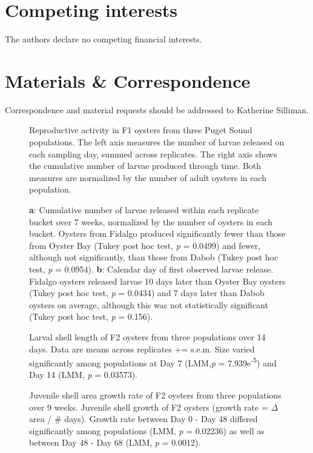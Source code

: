 \documentclass[fleqn,10pt]{wlscirep}
\begin{document}
\section*{Competing interests}
The authors declare no competing financial interests.

\section*{Materials \& Correspondence}
Correspondence and material requests should be addressed to Katherine Silliman.

\begin{figure}[H]
\caption{Reproductive activity in F1 oysters from three Puget Sound populations. The left axis measures the number of larvae released on each sampling day, summed across replicates. The right axis shows the cumulative number of larvae produced through time. Both measures are normalized by the number of adult oysters in each population.}
\label{fig:Figure 1}
\end{figure}

\begin{figure}[H]
\caption{\textbf{a}: Cumulative number of larvae released within each replicate bucket over 7 weeks, normalized by the number of oysters in each bucket. Oysters from Fidalgo produced significantly fewer than those from Oyster Bay (Tukey post hoc test, \textit{p} = 0.0499) and fewer, although not significantly, than those from Dabob (Tukey post hoc test, \textit{p} = 0.0954). \textbf{b}: Calendar day of first observed larvae release. Fidalgo oysters released larvae 10 days later than Oyster Bay oysters (Tukey post hoc test, \textit{p} = 0.0434) and 7 days later than Dabob oysters on average, although this was not statistically significant (Tukey post hoc test, \textit{p} = 0.156).}
\label{fig:Figure 2}
\end{figure}

\begin{figure}[H]
\caption{Larval shell length of F2 oysters from three populations over 14 days. Data are means across replicates += s.e.m. Size varied significantly among populations at Day 7 (LMM,\textit{p} = 7.939e\textsuperscript{-5}) and Day 14 (LMM, \textit{p} = 0.03573).}
\label{fig:Figure 3}
\end{figure}

\begin{figure}[H]
\caption{Juvenile shell area growth rate of F2 oysters from three populations over 9 weeks. Juvenile shell growth of F2 oysters (growth rate = $\Delta$area / \# days). Growth rate between Day 0 - Day 48 differed significantly among populations (LMM, \textit{p} = 0.02236) as well as between Day 48 - Day 68 (LMM, \textit{p} = 0.0012).}
\label{fig:Figure 4}
\end{figure}
\end{document}
